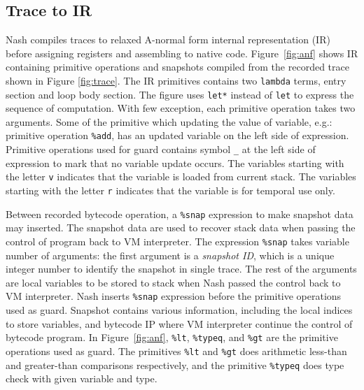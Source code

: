 \documentclass[preprint, numbers]{sigplanconf}
\begin{document}
\subsection{Trace to IR}
Nash compiles traces to relaxed A-normal form\cite{flanagan1993essence}
internal representation (IR) before assigning registers and assembling to
native code. Figure~\hyperref[fig:anf]{\ref{fig:anf}} shows IR containing
primitive operations and snapshots compiled from the recorded trace shown in
Figure \hyperref[fig:trace]{\ref{fig:trace}}. The IR primitives contains two
\texttt{lambda} terms, entry section and loop body section. The figure uses
\texttt{let*} instead of \texttt{let} to express the sequence of
computation. With few exception, each primitive operation takes two
arguments. Some of the primitive which updating the value of variable, e.g.:
primitive operation \texttt{\%add}, has an updated variable on the left side
of expression. Primitive operations used for guard contains symbol \texttt{\_}
at the left side of expression to mark that no variable update occurs. The
variables starting with the letter \texttt{v} indicates that the variable is
loaded from current stack. The variables starting with the letter \texttt{r}
indicates that the variable is for temporal use only.

Between recorded bytecode operation, a \texttt{\%snap} expression to make
snapshot data may inserted. The snapshot data are used to recover stack data
when passing the control of program back to VM interpreter.  The expression
\texttt{\%snap} takes variable number of arguments: the first argument is a
\textit{snapshot ID}, which is a unique integer number to identify the
snapshot in single trace. The rest of the arguments are local variables to be
stored to stack when Nash passed the control back to VM interpreter. Nash
inserts \texttt{\%snap} expression before the primitive operations used as
guard. Snapshot contains various information, including the local indices to
store variables, and bytecode IP where VM interpreter continue the control of
bytecode program. In Figure~\hyperref[fig:anf]{\ref{fig:anf}}, \texttt{\%lt},
\texttt{\%typeq}, and \texttt{\%gt} are the primitive operations used as
guard. The primitives \texttt{\%lt} and \texttt{\%gt} does arithmetic
less-than and greater-than comparisons respectively, and the primitive
\texttt{\%typeq} does type check with given variable and type.
\end{document}
